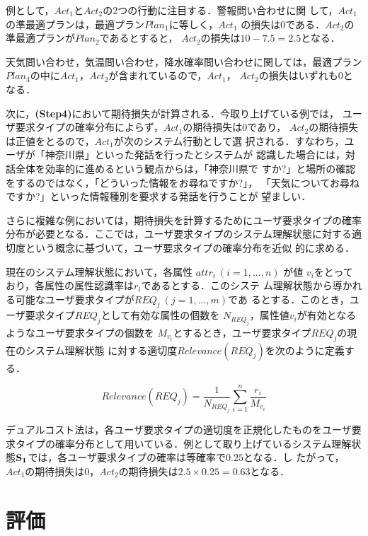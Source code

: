 例として，$Act_{1}$と$Act_{2}$の2つの行動に注目する．警報問い合わせに関
して，$Act_{1}$の準最適プランは，最適プラン$Plan_{1}$に等しく，$Act_{1}$ 
の損失は0である．$Act_{2}$の準最適プランが$Plan_{2}$であるとすると，
$Act_{2}$の損失は$10 - 7.5 = 2.5$となる．

天気問い合わせ，気温問い合わせ，降水確率問い合わせに関しては，最適プラン
$Plan_{3}$の中に$Act_{1}$，$Act_{2}$が含まれているので，$Act_{1}$，
$Act_{2}$の損失はいずれも0となる．

次に，{\bf (Step4)}において期待損失が計算される．今取り上げている例では，
ユーザ要求タイプの確率分布によらず，$Act_{1}$の期待損失は0であり，
$Act_{2}$の期待損失は正値をとるので，$Act_{1}$が次のシステム行動として選
択される．すなわち，ユーザが「神奈川県」といった発話を行ったとシステムが
認識した場合には，対話全体を効率的に進めるという観点からは，「神奈川県で
すか?」と場所の確認をするのではなく，「どういった情報をお尋ねですか?」，
「天気についてお尋ねですか?」といった情報種別を要求する発話を行うことが
望ましい．

さらに複雑な例においては，期待損失を計算するためにユーザ要求タイプの確率
分布が必要となる．ここでは，ユーザ要求タイプのシステム理解状態に対する適
切度\cite{YDK:01}という概念に基づいて，ユーザ要求タイプの確率分布を近似
的に求める．

現在のシステム理解状態において，各属性 $attr_{i}\ (i=1,...,n)$ が値
$v_{i}$をとっており，各属性の属性認識率は$r_{i}$であるとする．このシステ
ム理解状態から導かれる可能なユーザ要求タイプが$REQ_{j}\ (j=1,...,m)$であ
るとする．このとき，ユーザ要求タイプ$REQ_{j}$として有効な属性の個数を
$N_{REQ_{j}}$，属性値$v_{i}$が有効となるようなユーザ要求タイプの個数を
$M_{v_{i}}$とするとき，ユーザ要求タイプ$REQ_{j}$の現在のシステム理解状態
に対する適切度$Relevance(REQ_{j})$を次のように定義する．

\begin{equation}
Relevance(REQ_{j}) = \frac{1}{N_{REQ_{j}}}\sum_{i=1}^{n}\frac{r_{i}}{M_{v_{i}}}
\end{equation}

デュアルコスト法は，各ユーザ要求タイプの適切度を正規化したものをユーザ要
求タイプの確率分布として用いている．例として取り上げているシステム理解状
態${\bf S_{1}}$では，各ユーザ要求タイプの確率は等確率で$0.25$となる．し
たがって，$Act_{1}$の期待損失は$0$，$Act_{2}$の期待損失は$2.5 \times
0.25 = 0.63$となる．


\section{評価}
\label{sec-experiment}

